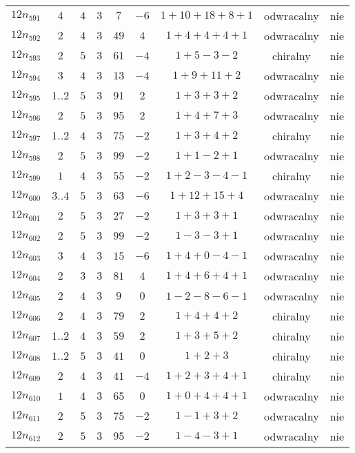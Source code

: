 \begin{longtable}{ccccccccc}
$12n_{591}$ & $4$ & $4$ & $3$ & $7$ & $-6$ & $1+10+18+8+1$ & odwracalny & nie \\
$12n_{592}$ & $2$ & $4$ & $3$ & $49$ & $4$ & $1+4+4+4+1$ & odwracalny & nie \\
$12n_{593}$ & $2$ & $5$ & $3$ & $61$ & $-4$ & $1+5-3-2$ & chiralny & nie \\
$12n_{594}$ & $3$ & $4$ & $3$ & $13$ & $-4$ & $1+9+11+2$ & odwracalny & nie \\
$12n_{595}$ & $1..2$ & $5$ & $3$ & $91$ & $2$ & $1+3+3+2$ & odwracalny & nie \\
$12n_{596}$ & $2$ & $5$ & $3$ & $95$ & $2$ & $1+4+7+3$ & odwracalny & nie \\
$12n_{597}$ & $1..2$ & $4$ & $3$ & $75$ & $-2$ & $1+3+4+2$ & chiralny & nie \\
$12n_{598}$ & $2$ & $5$ & $3$ & $99$ & $-2$ & $1+1-2+1$ & odwracalny & nie \\
$12n_{599}$ & $1$ & $4$ & $3$ & $55$ & $-2$ & $1+2-3-4-1$ & chiralny & nie \\
$12n_{600}$ & $3..4$ & $5$ & $3$ & $63$ & $-6$ & $1+12+15+4$ & odwracalny & nie \\
$12n_{601}$ & $2$ & $5$ & $3$ & $27$ & $-2$ & $1+3+3+1$ & odwracalny & nie \\
$12n_{602}$ & $2$ & $5$ & $3$ & $99$ & $-2$ & $1-3-3+1$ & odwracalny & nie \\
$12n_{603}$ & $3$ & $4$ & $3$ & $15$ & $-6$ & $1+4+0-4-1$ & odwracalny & nie \\
$12n_{604}$ & $2$ & $3$ & $3$ & $81$ & $4$ & $1+4+6+4+1$ & odwracalny & nie \\
$12n_{605}$ & $2$ & $4$ & $3$ & $9$ & $0$ & $1-2-8-6-1$ & odwracalny & nie \\
$12n_{606}$ & $2$ & $4$ & $3$ & $79$ & $2$ & $1+4+4+2$ & chiralny & nie \\
$12n_{607}$ & $1..2$ & $4$ & $3$ & $59$ & $2$ & $1+3+5+2$ & chiralny & nie \\
$12n_{608}$ & $1..2$ & $5$ & $3$ & $41$ & $0$ & $1+2+3$ & chiralny & nie \\
$12n_{609}$ & $2$ & $4$ & $3$ & $41$ & $-4$ & $1+2+3+4+1$ & chiralny & nie \\
$12n_{610}$ & $1$ & $4$ & $3$ & $65$ & $0$ & $1+0+4+4+1$ & odwracalny & nie \\
$12n_{611}$ & $2$ & $5$ & $3$ & $75$ & $-2$ & $1-1+3+2$ & odwracalny & nie \\
$12n_{612}$ & $2$ & $5$ & $3$ & $95$ & $-2$ & $1-4-3+1$ & odwracalny & nie \\

\end{longtable}
